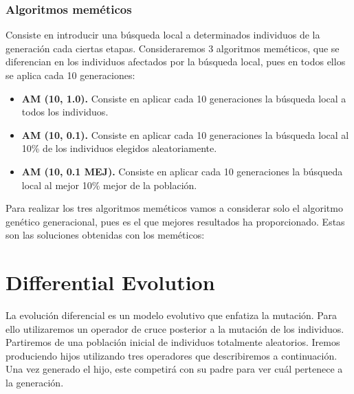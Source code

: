 \documentclass{article}
\begin{document}
\subsubsection{Algoritmos meméticos}
Consiste en introducir una búsqueda local a determinados individuos de la generación cada ciertas etapas. Consideraremos 3 algoritmos meméticos, que se diferencian en los individuos afectados por la búsqueda local, pues en todos ellos se aplica cada 10 generaciones:

\begin{itemize}
	\item \textbf{AM (10, 1.0).} Consiste en aplicar cada 10 generaciones la búsqueda local a todos los individuos.
	\item \textbf{AM (10, 0.1).} Consiste en aplicar cada 10 generaciones la búsqueda local al 10\% de los individuos elegidos aleatoriamente.
	\item \textbf{AM (10, 0.1 MEJ).} Consiste en aplicar cada 10 generaciones la búsqueda local al mejor 10\% mejor de la población.
\end{itemize}

Para realizar los tres algoritmos meméticos vamos a considerar solo el algoritmo genético generacional, pues es el que mejores resultados ha proporcionado. Estas son las soluciones obtenidas con los meméticos:
\begin{table}[H]
	\begin{center}
		\caption{Algoritmos meméticos}
		\label{tabla:a4}
	\end{center}
\end{table}


\section{Differential Evolution}
La evolución diferencial es un modelo evolutivo que enfatiza la mutación. Para ello utilizaremos un operador de cruce posterior a la mutación de los individuos. Partiremos de una población inicial de individuos totalmente aleatorios. Iremos produciendo hijos utilizando tres operadores que describiremos a continuación. Una vez generado el hijo, este competirá con su padre para ver cuál pertenece a la generación.
\end{document}
